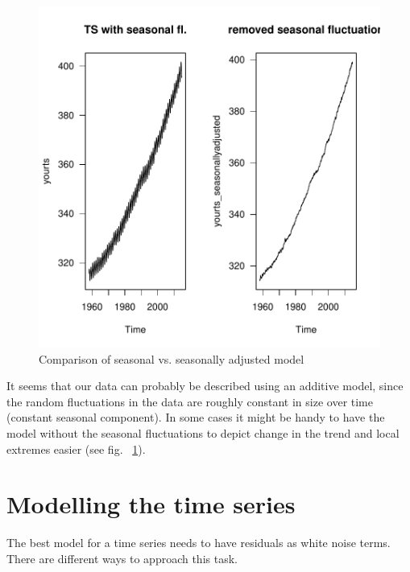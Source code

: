 \documentclass[11pt, a4paper]{article} %
\begin{document}
\begin{figure}[H]
\centering
\begin{Schunk}
\end{Schunk}
\includegraphics{alles-seasonallyadjusted}
\caption{Comparison of seasonal vs. seasonally adjusted model}
\label{decomposition2}
\end{figure}
\noindent It seems that our data can probably be described using an additive model, since the random fluctuations in the data are roughly constant in size over time (constant seasonal component). In some cases it might be handy to have the model without the seasonal fluctuations to depict change in the trend and local extremes easier (see fig. ~\ref{decomposition2}).

\section{Modelling the time series}
The best model for a time series needs to have residuals as white noise terms.
There are different ways to approach this task.
\end{document}
